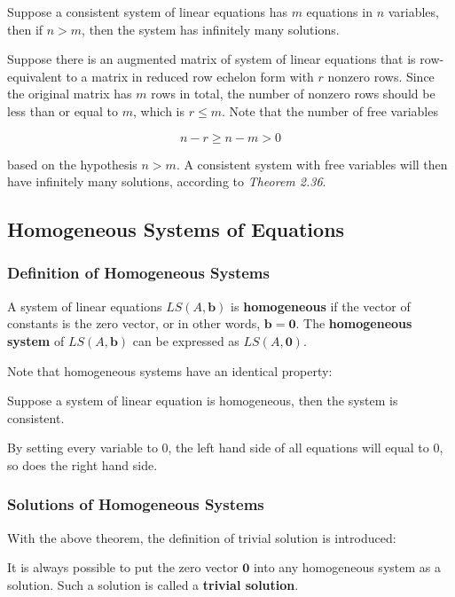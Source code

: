 \documentclass[a4paper,12pt]{article}
\begin{document}
\begin{thm}
  Suppose a consistent system of linear equations has $m$ equations in $n$ variables, then if $n>m$, then the system has infinitely many solutions.\n

  \prf Suppose there is an augmented matrix of system of linear equations that is row-equivalent to a matrix in reduced row echelon form with $r$ nonzero rows. Since the original matrix has $m$ rows in total, the number of nonzero rows should be less than or equal to $m$, which is $r\leq m$. Note that the number of free variables

  $$n-r\geq n-m>0$$

  based on the hypothesis $n>m$. A consistent system with free variables will then have infinitely many solutions, according to {\color{zr}\textit{Theorem 2.36}}.
\end{thm}

\subsection{Homogeneous Systems of Equations}
\subsubsection{Definition of Homogeneous Systems}
\begin{dft}
  A system of linear equations $LS(A,\mathbf{b})$ is \textbf{homogeneous} if the vector of constants is the zero vector, or in other words, $\mathbf{b}=\mathbf{0}$. The \textbf{homogeneous system} of $LS(A,\mathbf{b})$ can be expressed as $LS(A,\mathbf{0})$.
\end{dft}\n

Note that homogeneous systems have an identical property:\n

\begin{pst}
  Suppose a system of linear equation is homogeneous, then the system is consistent.\n

  \prf By setting every variable to $0$, the left hand side of all equations will equal to $0$, so does the right hand side.
\end{pst}

\subsubsection{Solutions of Homogeneous Systems}
With the above theorem, the definition of trivial solution is introduced:\n

\begin{dft}
  It is always possible to put the zero vector $\mathbf{0}$ into any homogeneous system as a solution. Such a solution is called a \textbf{trivial solution}.
\end{dft}\n
\end{document}
